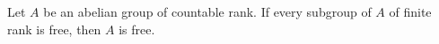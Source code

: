 Let $A$ be an abelian group of countable rank. If every subgroup of $A$ of finite rank is free, then $A$ is free.
